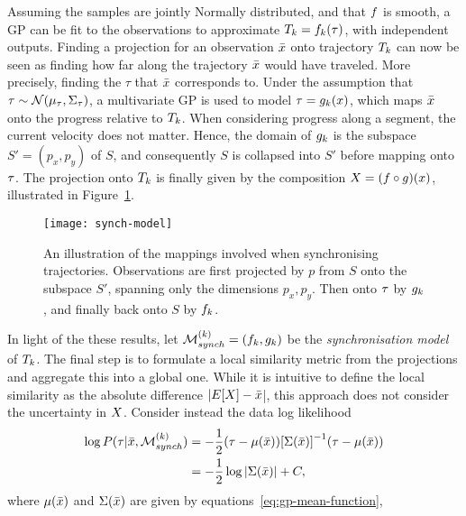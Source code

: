 Assuming the samples are jointly Normally distributed, and
that $f$ is smooth, a GP can be fit to the
observations to approximate $T_{k} = f_{k}(\tau)$, with
independent outputs. Finding a projection for an observation $\bar{x}$ onto trajectory
$T_{k}$ can now be seen as finding how far along the trajectory $\bar{x}$
would have traveled. More precisely, finding the $\tau$ that $\bar{x}$
corresponds to. Under the assumption that $\tau \sim
\mathcal{N}(\mu_{\tau}, \Sigma_{\tau})$, a multivariate
GP is used to model $\tau = g_{k}(x)$, which maps $\bar{x}$ onto the
progress relative to $T_{k}$. When considering progress along a
segment, the current velocity does not matter. Hence, the domain of
$g_{k}$ is the subspace $S' = (p_x, p_y)$ of $S$, and
consequently $S$ is collapsed into $S'$ before mapping onto $\tau$. The projection onto $T_{k}$ is
finally given by the composition $X = (f \circ
g)(x)$, illustrated in Figure~\ref{fig:synch-model}.
\begin{figure}
  \centering
  \texttt{[image: synch-model]}
  \caption{An illustration of the mappings involved when synchronising
    trajectories. Observations are first projected by $p$ from $S$ onto the
    subspace $S'$, spanning only the dimensions $p_x, p_y$. Then onto
    $\tau$ by $g_{k}$, and finally back onto $S$ by
    $f_{k}$.}\label{fig:synch-model}
\end{figure}
In light of the these results, let $\mathcal{M}_{synch}^{(k)} = (f_{k},
g_{k})$ be the \textit{synchronisation model} of $T_{k}$.
The final step is to formulate a local similarity metric from the
projections and aggregate this into a global one.
While it is intuitive to define the local similarity as the absolute difference $|E[X]
- \bar{x}$|, this approach does not consider the  uncertainty in $X$. 
Consider instead the data log likelihood
\begin{equation}
  \label{eq:model-log-likelihood}
  \begin{split}
    \log P(\tau|\bar{x}, \mathcal{M}_{synch}^{(k)})
    & = -\frac{1}{2}(\tau - \mu(\bar{x})){[\Sigma(\bar{x})]}^{-1}(\tau - \mu(\bar{x})) \\
    & = -\frac{1}{2}\log{|\Sigma(\bar{x})|}+C,
  \end{split}
\end{equation}
where $\mu(\bar{x})$ and $\Sigma(\bar{x})$ are given by
equations~\ref{eq:gp-mean-function},
